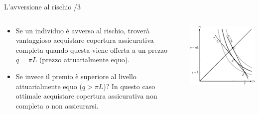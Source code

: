 \documentclass[aspectratio=64,11pt]{beamer}
\begin{document}
\begin{frame}{L'avversione al rischio /3}
\begin{columns}
\begin{column}{.5\columnwidth}
\begin{itemize}
\item Se un individuo è avverso al rischio, troverà vantaggioso acquistare
copertura assicurativa completa quando questa viene offerta a un prezzo
\(q=\pi L\) (prezzo \alert{attuarialmente equo}).
\item Se invece il premio è superiore al livello attuarialmente equo (\(q>\pi L\))?
In questo caso ottimale acquistare copertura assicurativa non completa o non
assicurarsi.
\end{itemize}
\end{column}

\begin{column}{.5\columnwidth}
\begin{center}
\includegraphics[width=.9\textwidth]{./figure/rischio-3.pdf}
\end{center}
\end{column}
\end{columns}
\end{frame}
\end{document}
